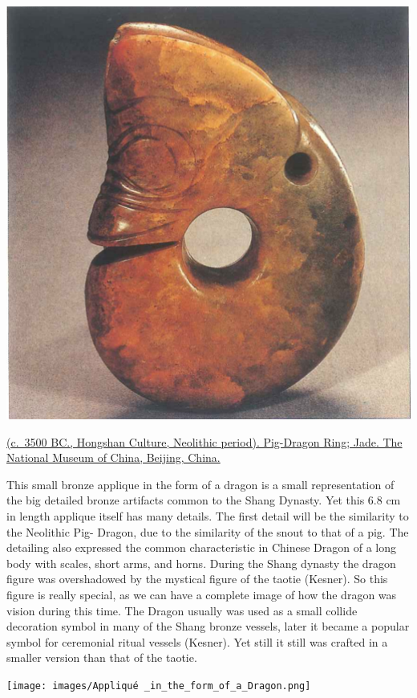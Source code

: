 \documentclass[
]{book}
\begin{document}
\includegraphics[width=1\textwidth,height=\textheight]{images/1. Jade_Pig_Dragon.png}

\href{}{(c.~3500 BC., Hongshan Culture, Neolithic period). Pig-Dragon Ring; Jade. The National Museum of China, Beijing, China.}

This small bronze applique in the form of a dragon is a small representation of the big detailed bronze artifacts common to the Shang Dynasty. Yet this 6.8 cm in length applique itself has many details. The first detail will be the similarity to the Neolithic Pig- Dragon, due to the similarity of the snout to that of a pig. The detailing also expressed the common characteristic in Chinese Dragon of a long body with scales, short arms, and horns. During the Shang dynasty the dragon figure was overshadowed by the mystical figure of the taotie (Kesner). So this figure is really special, as we can have a complete image of how the dragon was vision during this time. The Dragon usually was used as a small collide decoration symbol in many of the Shang bronze vessels, later it became a popular symbol for ceremonial ritual vessels (Kesner). Yet still it still was crafted in a smaller version than that of the taotie.

\texttt{[image: images/Appliqué \_in\_the\_form\_of\_a\_Dragon.png]}
\end{document}
